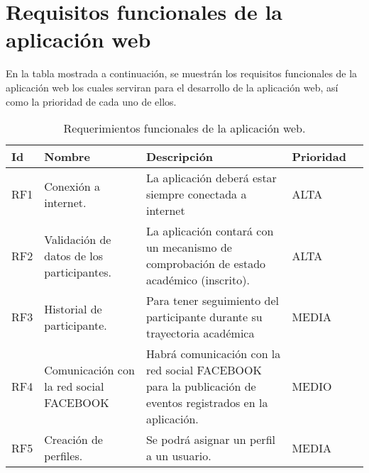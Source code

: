 \section{Requisitos funcionales de la aplicación web}
En la tabla mostrada a continuación, se muestrán los requisitos funcionales de la aplicación web los cuales serviran para el desarrollo de la aplicación web, así como la prioridad de cada uno de ellos.
\pagebreak
\begin{table}[htbp]
	\begin{center}
		\begin{tabular}{|l|p{45mm}|p{45mm}|p{45mm}|l}
			\hline
			Id & Nombre & Descripción & Prioridad \\
			\hline 
			RF1 & Conexión a internet. & La aplicación deberá estar siempre conectada a internet & ALTA \\ \hline
			RF2 & Validación de datos de los participantes. & La aplicación contará con un mecanismo de comprobación de estado académico (inscrito). & ALTA \\ \hline
			RF3 & Historial de participante. & Para tener seguimiento del participante durante su trayectoria académica & MEDIA  \\ \hline
			RF4 & Comunicación con la red social FACEBOOK &Habrá comunicación con la red social FACEBOOK para la publicación de eventos registrados en la aplicación.  & MEDIO \\ \hline
			RF5 & Creación de perfiles. & Se podrá asignar un perfil a un usuario.& MEDIA \\ \hline
		\end{tabular}
		\pagebreak
		\caption{Requerimientos funcionales de la aplicación web.}
		\label{requisitosFuncionales}
	\end{center}
\end{table}


